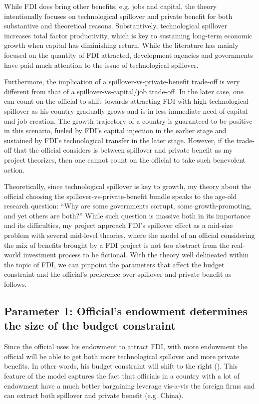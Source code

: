 While FDI does bring other benefits, e.g. jobs and capital, the theory intentionally focuses on technological spillover and private benefit for both substantive and theoretical reasons. Substantively, technological spillover increases total factor productivity, which is key to sustaining long-term economic growth when capital has diminishing return. While the literature has mainly focused on the quantity of FDI attracted, development agencies and governments have paid much attention to the issue of technological spillover. 

Furthermore, the implication of a spillover-vs-private-benefit trade-off is very different from that of a spillover-vs-capital/job trade-off. In the later case, one can count on the official to shift towards attracting FDI with high technological spillover as his country gradually grows and is in less immediate need of capital and job creation. The growth trajectory of a country is guaranteed to be positive in this scenario, fueled by FDI's capital injection in the earlier stage and sustained by FDI's technological transfer in the later stage. However, if the trade-off that the official considers is between spillover and private benefit as my project theorizes, then one cannot count on the official to take such benevolent action.

Theoretically, since technological spillover is key to growth, my theory about the official choosing the spillover-vs-private-benefit bundle speaks to the age-old research question: ``Why are some governments corrupt, some growth-promoting, and yet others are both?'' While such question is massive both in its importance and its difficulties, my project approach FDI's spillover effect as a mid-size problem with several mid-level theories, where the model of an official considering the mix of benefits brought by a FDI project is not too abstract from the real-world investment process to be fictional. With the theory well delineated within the topic of FDI, we can pinpoint the parameters that affect the budget constraint and the official's preference over spillover and private benefit as follows.

\subsection{Parameter 1: Official's endowment determines the size of the budget constraint}

Since the official uses his endowment to attract FDI, with more endowment the official will be able to get both more technological spillover and more private benefits. In other words, his budget constraint will shift to the right (). This feature of the model captures the fact that officials in a country with a lot of endowment have a much better bargaining leverage vis-a-vis the foreign firms and can extract both spillover and private benefit (e.g. China).

